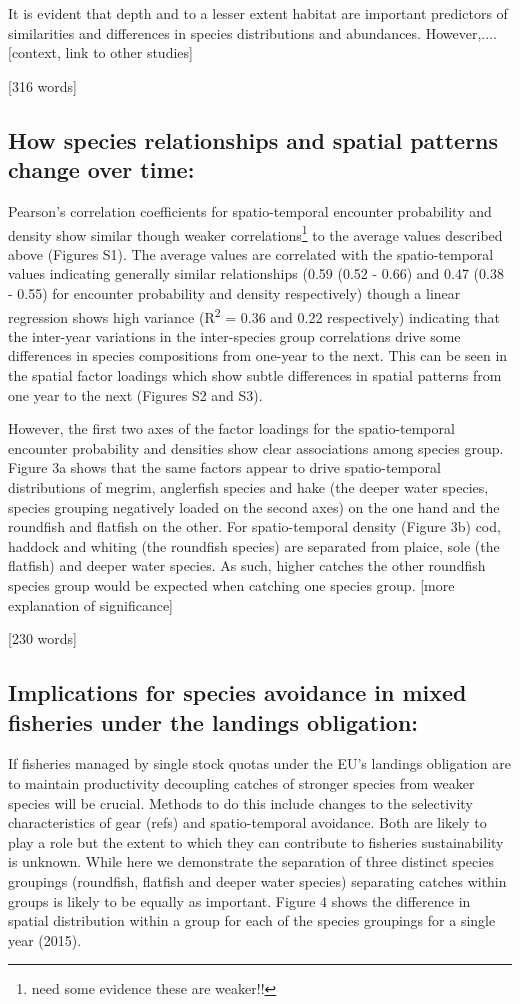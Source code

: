 \documentclass{nature}
\begin{document}
\begin{linenumbers}
It is evident that depth and to a lesser extent habitat are important
predictors of similarities and differences in species distributions and
abundances. However,.... [context, link to other studies]

[316 words]

\subsection{How species relationships and spatial patterns change over time:}
Pearson's correlation coefficients for spatio-temporal encounter probability
and density show similar though weaker correlations\footnote{need some evidence
	these are weaker!!} to the average values described above (Figures S1).
The average values are correlated with the spatio-temporal values indicating
generally similar relationships (0.59 (0.52 - 0.66) and 0.47 (0.38 - 0.55) for
encounter probability and density respectively) though a linear regression
shows high variance (R\textsuperscript{2} = 0.36 and 0.22 respectively)
indicating that the inter-year variations in the inter-species group
correlations drive some differences in species compositions from one-year to
the next.  This can be seen in the spatial factor loadings which show subtle
differences in spatial patterns from one year to the next (Figures S2 and S3). 

However, the first two axes of the factor loadings for the spatio-temporal
encounter probability and densities show clear associations among species
group. Figure 3a shows that the same factors appear to drive spatio-temporal
distributions of megrim, anglerfish species and hake (the deeper water species,
species grouping negatively loaded on the second axes) on the one hand and the
roundfish and flatfish on the other. For spatio-temporal density (Figure 3b)
cod, haddock and whiting (the roundfish species) are separated from plaice,
sole (the flatfish) and deeper water species. As such, higher catches the other
roundfish species group would be expected when catching one species group.
[more explanation of significance]

[230 words]

\subsection{Implications for species avoidance in mixed fisheries under the
	landings obligation:}
If fisheries managed by single stock quotas under the EU's landings obligation
are to maintain productivity decoupling catches of stronger species from weaker
species will be crucial.  Methods to do this include changes to the selectivity
characteristics of gear (refs) and spatio-temporal avoidance. Both are likely
to play a role but the extent to which they can contribute to fisheries
sustainability is unknown. While here we demonstrate the separation of three
distinct species groupings (roundfish, flatfish and deeper water species)
separating catches within groups is likely to be equally as important. Figure 4 shows
the difference in spatial distribution within a group for each of the species
groupings for a single year (2015). 


\end{linenumbers}
\end{document}
